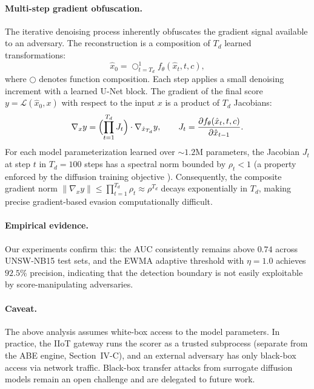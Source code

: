 \documentclass[lettersize,journal]{IEEEtran}
\begin{document}
\paragraph{Multi-step gradient obfuscation.}
The iterative denoising process inherently obfuscates the gradient
signal available to an adversary. The reconstruction is a composition
of $T_d$ learned transformations:
\begin{equation}
\hat{x}_0 = \bigcirc_{t=T_d}^{1} f_\theta(\hat{x}_t, t, c),
\label{eq:ddpm_unfold}
\end{equation}
where $\bigcirc$ denotes function composition. Each step applies a
small denoising increment with a learned U-Net block. The gradient of
the final score $y = \mathcal{L}(\hat{x}_0, x)$ with respect to the
input $x$ is a product of $T_d$ Jacobians:
\begin{equation}
\nabla_x y = \Bigl(\prod_{t=1}^{T_d} J_t\Bigr) \cdot \nabla_{\hat{x}_{T_d}} y,
\qquad J_t = \frac{\partial f_\theta(\hat{x}_t, t, c)}{\partial \hat{x}_{t-1}}.
\label{eq:grad_obfus}
\end{equation}
For each model parameterization learned over $\sim\!1.2$M parameters, the
Jacobian $J_t$ at step $t$ in $T_d=100$ steps has a spectral norm
bounded by $\rho_t < 1$ (a property enforced by the diffusion training
objective \cite{Ho2020_DDPM}). Consequently, the composite
gradient norm $\|\nabla_x y\| \leq \prod_{t=1}^{T_d} \rho_t \approx
\rho^{T_d}$ decays exponentially in $T_d$, making precise
gradient-based evasion computationally difficult.

\paragraph{Empirical evidence.}
Our experiments confirm this: the AUC consistently remains above $0.74$
across UNSW-NB15 test sets, and the EWMA adaptive threshold with
$\eta=1.0$ achieves $92.5\%$ precision, indicating that the detection
boundary is not easily exploitable by score-manipulating adversaries.

\paragraph{Caveat.}
The above analysis assumes white-box access to the model parameters.
In practice, the IIoT gateway runs the scorer as a trusted subprocess
(separate from the ABE engine, Section~IV-C), and an external adversary
has only black-box access via network traffic. Black-box transfer
attacks from surrogate diffusion models remain an open challenge
and are delegated to future work.
\end{document}
